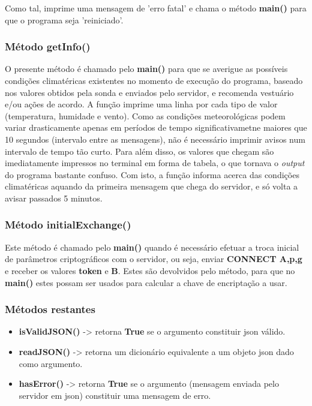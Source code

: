 \documentclass{report}
\begin{document}
Como tal, imprime uma mensagem de 'erro fatal' e chama o método \textbf{main()} para que o programa seja 'reiniciado'.

\subsubsection{Método getInfo()}
O presente método é chamado pelo \textbf{main()} para que se averigue as possíveis condições climatéricas existentes no momento de execução do programa, baseado nos valores obtidos pela sonda e enviados pelo servidor, e recomenda vestuário e/ou ações de acordo. A função imprime uma linha por cada tipo de valor (temperatura, humidade e vento).
\newline
Como as condições meteorológicas podem variar drasticamente apenas em períodos de tempo significativametne maiores que 10 segundos (intervalo entre as mensagens), não é necessário imprimir avisos num intervalo de tempo tão curto. Para além disso, os valores que chegam são imediatamente impressos no terminal em forma de tabela, o que tornava o \textit{output} do programa bastante confuso. Com isto, a função informa acerca das condições climatéricas aquando da primeira mensagem que chega do servidor, e só volta a avisar passados 5 minutos.

\subsubsection{Método initialExchange()}
Este método é chamado pelo \textbf{main()} quando é necessário efetuar a troca inicial de parâmetros criptográficos com o servidor, ou seja, enviar \textbf{CONNECT A,p,g} e receber os valores \textbf{token} e \textbf{B}. 
Estes são devolvidos pelo método, para que no \textbf{main()} estes possam ser usados para calcular a chave de encriptação a usar.

\subsubsection{Métodos restantes}
\begin{itemize}
  \item \textbf{isValidJSON()} -> retorna \textbf{True} se o argumento constituir \ac{json} válido.
  \item \textbf{readJSON()} -> retorna um dicionário equivalente a um objeto \ac{json} dado como argumento.
  \item \textbf{hasError()} -> retorna \textbf{True} se o argumento (mensagem enviada pelo servidor em \ac{json}) constituir uma mensagem de erro.
\end{itemize}
\end{document}
